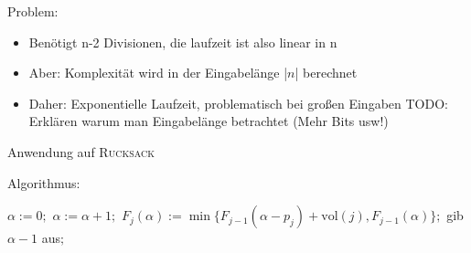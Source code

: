 \begin{frame}
Problem:

\begin{itemize}
\item
Benötigt n-2 Divisionen, die laufzeit ist also linear in n
\item
Aber: Komplexität wird in der Eingabelänge |$n$| berechnet
\item
Daher: Exponentielle Laufzeit, problematisch bei großen Eingaben
TODO: Erklären warum man Eingabelänge betrachtet (Mehr Bits usw!)
\end{itemize}
\end{frame}

\begin{frame}
Anwendung auf \textsc{Rucksack}
\newline

Algorithmus: \newline

\begin{algorithmic}
\State $\alpha:=0;$
\Repeat
	\State $\alpha:=\alpha+1;$
		\State $F_j(\alpha):=\min\{F_{j-1}(\alpha-p_j)+\text{vol}(j),F_{j-1}(\alpha)\};$
	\EndFor
{}
\State gib $\alpha-1$ aus$;$
\end{algorithmic}

\end{frame}